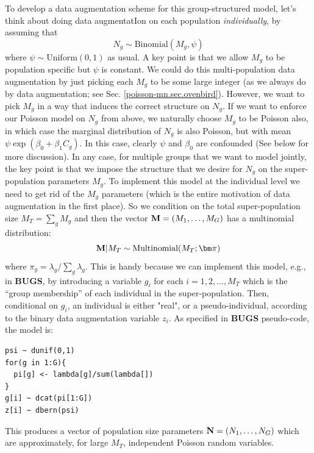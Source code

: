To develop a data augmentation scheme for this group-structured model,
let's think about doing data augmentatIon on each population {\it
  individually}, by assuming that
\[
 N_{g} \sim \mbox{Binomial}(M_{g} , \psi)
\]
where $\psi \sim \mbox{Uniform}(0,1)$ as usual.  A key point is that
we allow $M_{g}$ to be population specific but $\psi$ is constant.  We
could do this multi-population data augmentation by just picking each
$M_{g}$ to be some large integer (as we always do by data
augmentation; see Sec. \ref{poisson-mn.sec.ovenbird}). However, we
want to pick $M_{g}$ in a way that induces
the correct structure on
$N_{g}$. If we want to enforce our Poisson model on $N_{g}$ from
above, we naturally choose $M_{g}$ to be Poisson also, in which case
the marginal distribution of $N_{g}$ is also Poisson, but with mean
$\psi \exp(\beta_{0} + \beta_{1}C_{g})$.  In this case, clearly $\psi$ and
$\beta_{0}$ are confounded (See below for more discussion).
In any case, for multiple groups that we want to model jointly, the
key point is that we
 impose the structure that we desire for $N_{g}$ on the
super-population parameters $M_{g}$.  To implement this model at the
individual level we need to get rid of the $M_{g}$ parameters (which
is the entire motivation of data augmentation in the first place). So
we condition on the total super-population size $M_{T}= \sum_{g}
M_{g}$ and then the vector ${\bf M} = (M_{1},\ldots,M_{G})$ has a
multinomial distribution:
\begin{equation}
{\bf M}|M_{T} \sim \mbox{Multinomial}(M_{T};  {\bm \pi} )
\label{eq.mn1}
\end{equation}
where
$\pi_{g} = \lambda_{g}/\sum_{g} \lambda_{g}$.  This is handy because
we can implement this model, e.g., in {\bf BUGS}, by introducing a
variable $g_{i}$ for each $i=1,2,\ldots, M_{T}$ which is the ``group
membership'' of each individual in the super-population.  Then,
conditional on $g_{i}$, an individual is either "real", or a
pseudo-individual, according to the binary data augmentation variable
$z_{i}$.  As specified in {\bf BUGS} pseudo-code, the
model is:
\begin{verbatim}
psi ~ dunif(0,1)
for(g in 1:G){
  pi[g] <- lambda[g]/sum(lambda[])
}
g[i] ~ dcat(pi[1:G])
z[i] ~ dbern(psi)
\end{verbatim}
This produces a vector of population size parameters ${\bf N} =
(N_{1},\ldots,N_{G})$ which are approximately, for large $M_{T}$,
independent Poisson random variables.

